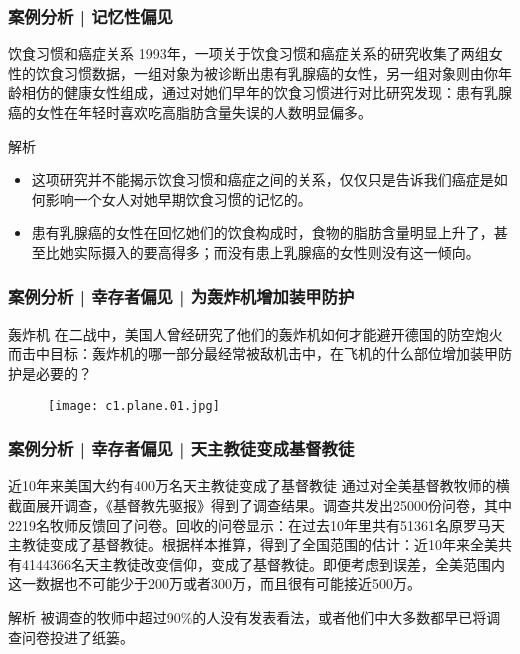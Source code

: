 \begin{frame}
  \frametitle{案例分析 | 记忆性偏见}
  \begin{block}{饮食习惯和癌症关系}
    1993年，一项关于饮食习惯和癌症关系的研究收集了两组女性的饮食习惯数据，一组对象为被诊断出患有乳腺癌的女性，另一组对象则由你年龄相仿的健康女性组成，通过对她们早年的饮食习惯进行对比研究发现：患有乳腺癌的女性在年轻时喜欢吃高脂肪含量失误的人数明显偏多。
  \end{block}
  \pause
  \begin{block}{解析}
    \begin{itemize}
      \item 这项研究并不能揭示饮食习惯和癌症之间的关系，仅仅只是告诉我们癌症是如何影响一个女人对她早期饮食习惯的记忆的。
      \item 患有乳腺癌的女性在回忆她们的饮食构成时，食物的脂肪含量明显上升了，甚至比她实际摄入的要高得多；而没有患上乳腺癌的女性则没有这一倾向。
    \end{itemize}
  \end{block}
\end{frame}

\begin{frame}
  \frametitle{案例分析 | 幸存者偏见 | 为轰炸机增加装甲防护}
  \begin{block}{轰炸机}
在二战中，美国人曾经研究了他们的轰炸机如何才能避开德国的防空炮火而击中目标：轰炸机的哪一部分最经常被敌机击中，在飞机的什么部位增加装甲防护是必要的？
  \end{block}
  \begin{figure}
    \centering
    \texttt{[image: c1.plane.01.jpg]}
  \end{figure}
\end{frame}

\begin{frame}
  \frametitle{案例分析 | 幸存者偏见 | 天主教徒变成基督教徒}
  \begin{block}{近10年来美国大约有400万名天主教徒变成了基督教徒}
通过对全美基督教牧师的横截面展开调查，《基督教先驱报》得到了调查结果。调查共发出25000份问卷，其中2219名牧师反馈回了问卷。回收的问卷显示：在过去10年里共有51361名原罗马天主教徒变成了基督教徒。根据样本推算，得到了全国范围的估计：近10年来全美共有4144366名天主教徒改变信仰，变成了基督教徒。即便考虑到误差，全美范围内这一数据也不可能少于200万或者300万，而且很有可能接近500万。
  \end{block}
  \pause
  \begin{block}{解析}
    被调查的牧师中超过90\%的人没有发表看法，或者他们中大多数都早已将调查问卷投进了纸篓。
  \end{block}
\end{frame}

